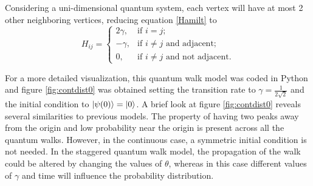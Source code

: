 \documentclass[../../dissertation.tex]{subfiles}
\begin{document}
Considering a uni-dimensional quantum system, each vertex will have at most 2
other neighboring vertices, reducing equation \eqref{Hamilt} to
\begin{equation}
	H_{ij} = \begin{cases} 
		2\gamma, & \mbox{if } i= j; \\ 
		-\gamma, & \mbox{if } i\neq j\mbox{ and adjacent};\\
		0, & \mbox{if } i\neq j\mbox{ and not adjacent}.
	\end{cases}
\end{equation}\par

For a more detailed visualization, this quantum walk model was coded in Python
and figure \ref{fig:contdist0} was obtained setting the transition rate to
$\gamma=\frac{1}{2\sqrt{2}}$ and the initial condition to $\ket{\psi(0)} = \ket{0}$.
A brief look at figure \ref{fig:contdist0} reveals several similarities to
previous models. The property of having two peaks away from the origin and low
probability near the origin is present across all the quantum walks. However, in
the continuous case, a symmetric initial condition is not needed. In the
staggered quantum walk model, the propagation of the walk could be altered by
changing the values of $\theta$, whereas in this case different values of
$\gamma$ and time will influence the probability distribution.\par
\end{document}
